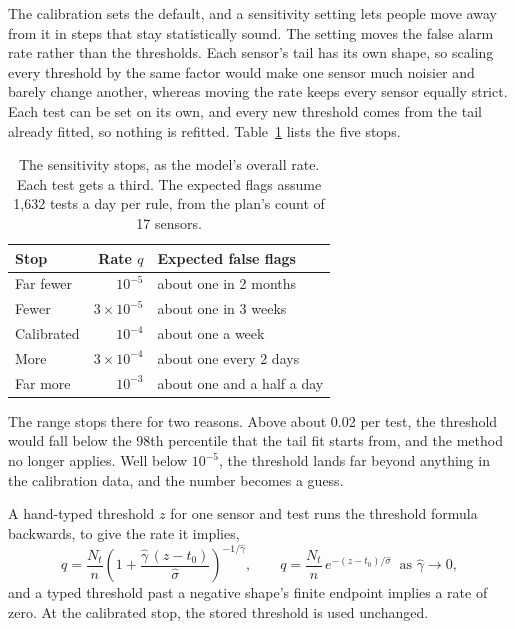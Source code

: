 \documentclass{article}
\begin{document}
The calibration sets the default, and a sensitivity setting lets people move
away from it in steps that stay statistically sound. The setting moves the
false alarm rate rather than the thresholds. Each sensor's tail has its own
shape, so scaling every threshold by the same factor would make one sensor much
noisier and barely change another, whereas moving the rate keeps every sensor
equally strict. Each test can be set on its own, and every new threshold comes
from the tail already fitted, so nothing is refitted. Table~\ref{tab:stops}
lists the five stops.

\begin{table}[t]
  \centering
  \caption{The sensitivity stops, as the model's overall rate. Each test gets a
    third. The expected flags assume 1{,}632 tests a day per rule, from the
    plan's count of 17 sensors.}
  \label{tab:stops}
  \begin{tabular}{lrl}
    \toprule
    Stop & Rate $q$ & Expected false flags \\
    \midrule
    Far fewer  & $10^{-5}$ & about one in 2 months \\
    Fewer      & $3 \times 10^{-5}$ & about one in 3 weeks \\
    Calibrated & $10^{-4}$ & about one a week \\
    More       & $3 \times 10^{-4}$ & about one every 2 days \\
    Far more   & $10^{-3}$ & about one and a half a day \\
    \bottomrule
  \end{tabular}
\end{table}

The range stops there for two reasons. Above about 0.02 per test, the threshold
would fall below the 98th percentile that the tail fit starts from, and the
method no longer applies. Well below $10^{-5}$, the threshold lands far beyond
anything in the calibration data, and the number becomes a guess.

A hand-typed threshold $z$ for one sensor and test runs the threshold formula
backwards, to give the rate it implies,
\begin{equation}
  q = \frac{N_{t}}{n}\left(1 + \frac{\hat{\gamma}\,(z - t_{0})}{\hat{\sigma}}\right)^{-1/\hat{\gamma}},
  \qquad
  q = \frac{N_{t}}{n}\, e^{-(z - t_{0}) / \hat{\sigma}} \ \text{ as } \hat{\gamma} \to 0 ,
\end{equation}
and a typed threshold past a negative shape's finite endpoint implies a rate
of zero. At the calibrated stop, the stored threshold is used unchanged.
\end{document}
